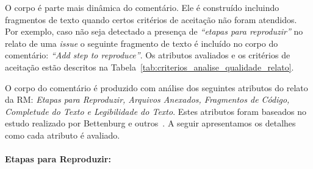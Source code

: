 O corpo é parte mais dinâmica do comentário. Ele é construído incluindo
fragmentos de texto quando certos critérios de aceitação não foram atendidos.
Por exemplo, caso não seja detectado a presença de \textit{``etapas para
    reproduzir''} no relato de uma \textit{issue} o seguinte fragmento de texto é
incluído no corpo do comentário: \textit{``Add step to reproduce''}. Os
atributos avaliados e os critérios de aceitação estão descritos na
Tabela~\ref{tab:criterios_analise_qualidade_relato}.

\begin{table}[htpb]
\centering
{}
\caption{Critérios de aceitação e forma de análise utilizados na análise de
    qualidade do relato.}
\label{tab:criterios_analise_qualidade_relato}
\end{table}

O corpo do comentário é produzido com análise dos seguintes atributos do relato
da RM\@: \textit{Etapas para Reproduzir, Arquivos Anexados, Fragmentos de
    Código, Completude do Texto e Legibilidade do Texto}. Estes atributos foram
baseados no estudo realizado por Bettenburg e outros~\cite{bettenburg2008makes}.
A seguir apresentamos os detalhes como cada atributo é avaliado.

\paragraph{Etapas para Reproduzir:}
\label{par:etapas_para_reproduzir_}

